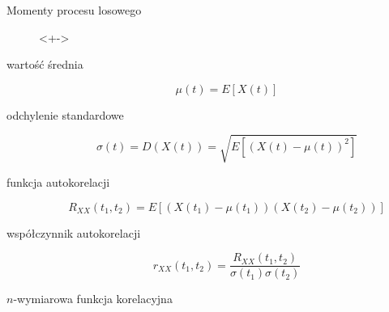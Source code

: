 \documentclass{mp}
\begin{document}
\begin{frame}{Momenty procesu losowego}
\begin{description}<+->
\item[wartość średnia] \[ \mu(t)=E\left[X(t)\right] \]
\item[odchylenie standardowe] \[ \sigma(t)=D(X(t))=\sqrt{E\left[(X(t)-\mu(t))^2\right]} \]
\item[funkcja autokorelacji] \[R_{XX}(t_1,t_2)=E\left[(X(t_1)-\mu(t_1))(X(t_2)-\mu(t_2))\right] \]
\item[współczynnik autokorelacji] \[r_{XX}(t_1,t_2)=\frac{R_{XX}(t_1,t_2)}{\sigma(t_1)\sigma(t_2)} \]
\item[$n$-wymiarowa funkcja korelacyjna]
\end{description}
\end{frame}
\end{document}

